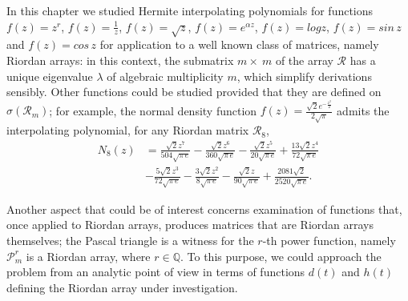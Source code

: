 
In this chapter we studied Hermite interpolating polynomials for functions
$f(z)=z^{r}$, ${f(z)=\frac{1}{z}}$, ${f(z)=\sqrt{z}}$, ${f(z)=e^{\alpha z}}$,
${f(z)=log{z}}$, ${f(z)=sin\,{z}}$ and ${f(z)=cos\,{z}}$ for application
to a well known class of matrices, namely Riordan arrays: in this context,
the submatrix $m\times~m$ of the array $\mathcal{R}$ has a unique eigenvalue
$\lambda$ of algebraic multiplicity $m$, which simplify derivations sensibly.
Other functions could be studied provided that they are defined on
$\sigma(\mathcal{R}_{m})$; for example, the normal density function
$\displaystyle f{\left (z \right )} = \frac{\sqrt{2} e^{- \frac{z^{2}}{2}}}{2
\sqrt{\pi}}$ admits the interpolating polynomial, for any Riordan matrix
$\mathcal{R}_{8}$,
\begin{displaymath}
\begin{split}
{N_{ 8 }}{\left (z \right )} &=
\frac{\sqrt{2} z^{7}}{504 \sqrt{\pi\,e} } - \frac{\sqrt{2}
z^{6}}{360 \sqrt{\pi\,e} } - \frac{\sqrt{2} z^{5}}{20 \sqrt{\pi\,e}
} + \frac{13 \sqrt{2} z^{4}}{72 \sqrt{\pi\,e} }\\
&- \frac{5 \sqrt{2} z^{3}}{72 \sqrt{\pi\,e} } - \frac{3 \sqrt{2}
z^{2}}{8 \sqrt{\pi\,e} } - \frac{\sqrt{2} z}{90 \sqrt{\pi\,e}
} + \frac{2081 \sqrt{2}}{2520 \sqrt{\pi\,e} }.
\end{split}
\end{displaymath}


    Another aspect that could be of interest concerns
    examination of functions that, once applied to Riordan arrays, produces
    matrices that are Riordan arrays themselves; the Pascal triangle is a
    witness for the $r$-th power function, namely $\mathcal{P}_{m}^{r}$ is a
    Riordan array, where $r\in\mathbb{Q}$. To this purpose, we could approach
    the problem from an analytic point of view in terms of functions $d(t)$ and
    $h(t)$ defining the Riordan array under investigation.



